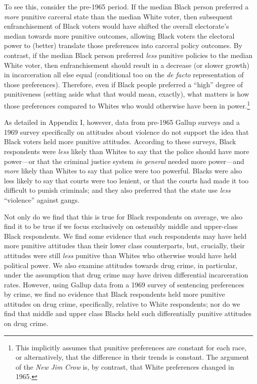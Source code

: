 \documentclass[12pt]{article}
\begin{document}
To see this, consider the pre-1965 period. If the median Black person preferred a \emph{more} punitive carceral state than the median White voter, then subsequent enfranchisement of Black voters would have shifted the overall electorate's median towards more punitive outcomes, allowing Black voters the electoral power to (better) translate those preferences into carceral policy outcomes.  By contrast, if the median Black person preferred \emph{less} punitive policies to the median White voter, then enfranchisement should result in a decrease (or slower growth) in incarceration all else equal (conditional too on the \emph{de facto} representation of those preferences). Therefore, even if Black people preferred a ``high'' degree of punitiveness (setting aside what that would mean, exactly), what matters is how those preferences compared to Whites who would otherwise have been in power.\footnote{This implicitly assumes that punitive preferences are constant for each race, or alternatively, that the difference in their trends is constant. The argument of the \emph{New Jim Crow} is, by contrast, that White preferences changed in 1965.}

As detailed in Appendix I, however, data from pre-1965 Gallup surveys and a 1969 survey specifically on attitudes about violence \citep{Violence1969} do not support the idea that Black voters held more punitive attitudes. According to these surveys, Black respondents were \emph{less} likely than Whites to say that the police should have more power---or that the criminal justice system \emph{in general} needed more power---and \emph{more} likely than Whites to say that police were too powerful.  Blacks were also less likely to say that courts were too lenient, or that the courts had made it too difficult to punish criminals; and they also preferred that the state use \emph{less} ``violence'' against gangs.

Not only do we find that this is true for Black respondents on average, we also find it to be true if we focus exclusively on ostensibly middle and upper-class Black respondents.  We find some evidence that such respondents may have held more punitive attitudes than their lower class counterparts, but, crucially, their attitudes were still \emph{less} punitive than Whites who otherwise would have held political power.  We also examine attitudes towards drug crime, in particular, under the assumption that drug crime may have driven differential incarceration rates.  However, using Gallup data from a 1969 survey of sentencing preferences by crime, we find no evidence that Black respondents held more punitive attitudes on drug crime, specifically, relative to White respondents; nor do we find that middle and upper class Blacks held such differentially punitive attitudes on drug crime.
\end{document}
